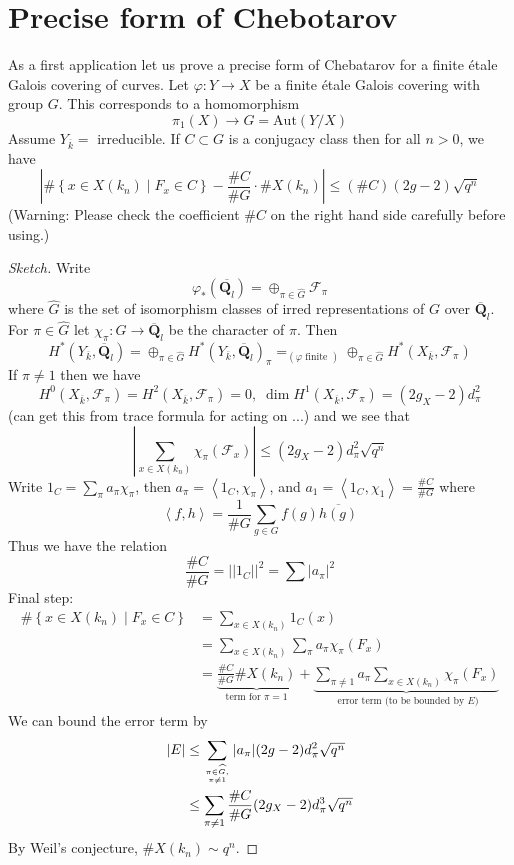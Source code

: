 \section{Precise form of Chebotarov}
\label{section-chebotarov}

\noindent
As a first application let us prove a precise form of Chebatarov
for a finite \'etale Galois covering of curves.
Let $\varphi : Y \to X$ be a finite \'etale Galois covering with
group $G$. This corresponds to a homomorphism
$$
\pi_1(X) \longrightarrow G = \text{Aut}(Y/X)
$$
Assume $Y_{\overline k} = $ irreducible. If $C\subset G$ is a conjugacy
class then for all $n>0$, we have
$$
\left|
\#\left\{x \in X(k_n) \mid F_x \in C \right\} -
\frac{\# C}{\# G} \cdot \# X(k_n)
\right|
\leq
(\# C)(2g - 2) \sqrt{q^n}
$$
(Warning: Please check the coefficient $\# C$ on the right hand side
carefully before using.)

\begin{proof}[Sketch]
Write
$$
\varphi_*(\overline{\mathbf{Q}_l}) =
\oplus_{\pi \in \widehat G} \mathcal{F}_{\pi}
$$
where $\widehat G$ is the set of isomorphism
classes of irred representations of
$G$ over $\overline{\mathbf{Q}}_l$. For $\pi \in \widehat G$
let $\chi_{\pi}: G \to \overline{\mathbf{Q}}_l$
be the character of $\pi$. Then
$$
H^*(Y_{\overline k}, \overline{\mathbf{Q}}_l) =
\oplus_{\pi\in \widehat G}
H^*(Y_{\overline k}, \overline{\mathbf{Q}}_l)_\pi
=_{(\varphi\text{ finite })}
\oplus_{\pi\in \widehat G}
H^*(X_{\overline k}, \mathcal{F}_\pi)
$$
If $\pi\neq 1$ then we have
$$
H^0(X_{\overline k}, \mathcal{F}_\pi) = H^2(X_{\overline k},
\mathcal{F}_\pi)=0, \; \dim H^1(X_{\overline k}, \mathcal{F}_\pi) =
(2g_X-2)d_\pi^2
$$
(can get this from trace formula for acting on ...) and we see that
$$
\left|\sum_{x \in X(k_n)} \chi_\pi(\mathcal{F}_x)\right|
\leq
(2g_X - 2) d_\pi^2\sqrt{q^n}
$$
Write $1_C = \sum_\pi a_\pi \chi_\pi$, then
$a_\pi = \left<1_C, \chi_\pi\right>$, and
$a_1 = \left<1_C, \chi_1\right> = \frac{\# C}{\# G}$ where
$$
\left<f, h\right> = \frac{1}{\# G}\sum_{g \in G} f(g)\overline{h(g)}
$$
Thus we have the relation
$$
\frac{\# C}{\# G} = ||1_C||^2 = \sum|a_\pi|^2
$$
Final step:
\begin{align*}
\#\left\{x \in X(k_n) \mid F_x \in C\right\}
& =
\sum_{x \in X(k_n)} 1_C(x) \\
& =
\sum_{x \in X(k_n)} \sum_\pi a_\pi \chi_\pi(F_x) \\
& =
\underbrace{\frac{\# C}{\# G} \# X(k_n)}_{
\text{term for }\pi = 1}
+
\underbrace{\sum_{\pi\neq 1}a_\pi\sum_{x\in X(k_n)}\chi_\pi(F_x)}_{
\text{ error term (to be bounded by $E$)}}
\end{align*}
We can bound the error term by
\begin{align*}
|E|
& \leq
\sum_{\pi \in \widehat G, \atop \pi \neq 1}
|a_\pi| (2g - 2) d_\pi^2 \sqrt{q^n} \\
& \leq
\sum_{\pi \neq 1} \frac{\# C}{\# G} (2g_X - 2) d_\pi^3 \sqrt{q^n}
\end{align*}
By Weil's conjecture, $\# X(k_n)\sim q^n$.
\end{proof}



